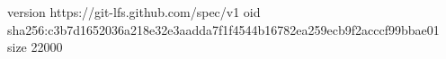 version https://git-lfs.github.com/spec/v1
oid sha256:c3b7d1652036a218e32e3aadda7f1f4544b16782ea259ecb9f2acccf99bbae01
size 22000

